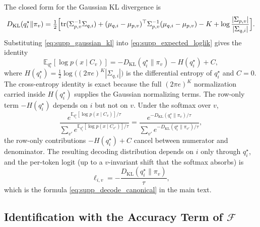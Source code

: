 \documentclass[twoside,11pt]{article}
\begin{document}
The closed form for the Gaussian KL divergence \cite[App.~B]{Bishop2006} is
\begin{equation}
D_{\mathrm{KL}}(q_i^{\star} \| \pi_v)
=
\tfrac{1}{2}\Bigl[
\mathrm{tr}(\Sigma_{p,v}^{-1}\Sigma_{q,i})
+ (\mu_{q,i} - \mu_{p,v})^{\top} \Sigma_{p,v}^{-1} (\mu_{q,i} - \mu_{p,v})
- K
+ \log\frac{|\Sigma_{p,v}|}{|\Sigma_{q,i}|}
\Bigr].
\label{eq:supp_gaussian_kl}
\end{equation}
Substituting \eqref{eq:supp_gaussian_kl} into \eqref{eq:supp_expected_loglik} gives the identity
\begin{equation}
\mathbb{E}_{q_i^{\star}}[\log p(x \mid C_v)]
=
-D_{\mathrm{KL}}(q_i^{\star} \| \pi_v)
- H(q_i^{\star})
+ C,
\label{eq:supp_kl_decomposition}
\end{equation}
where $H(q_i^{\star}) = \tfrac{1}{2}\log\bigl((2\pi e)^K |\Sigma_{q,i}|\bigr)$ is the differential entropy of $q_i^{\star}$ and $C=0$. The cross-entropy identity is exact because the full $(2\pi e)^K$ normalization carried inside $H(q_i^{\star})$ supplies the Gaussian normalizing terms. The row-only term $-H(q_i^{\star})$ depends on $i$ but not on $v$. Under the softmax over $v$,
\begin{equation}
\frac{e^{\mathbb{E}_{q_i^{\star}}[\log p(x \mid C_v)]/\tau}}
     {\sum_{v'} e^{\mathbb{E}_{q_i^{\star}}[\log p(x \mid C_{v'})]/\tau}}
=
\frac{e^{-D_{\mathrm{KL}}(q_i^{\star} \| \pi_v)/\tau}}
     {\sum_{v'} e^{-D_{\mathrm{KL}}(q_i^{\star} \| \pi_{v'})/\tau}},
\label{eq:supp_softmax_cancellation}
\end{equation}
the row-only contributions $-H(q_i^{\star}) + C$ cancel between numerator and denominator. The resulting decoding distribution depends on $i$ only through $q_i^{\star}$, and the per-token logit (up to a $v$-invariant shift that the softmax absorbs) is
\begin{equation}
\ell_{i,v} = -\frac{D_{\mathrm{KL}}(q_i^{\star} \| \pi_v)}{\tau},
\label{eq:supp_decode_recovered}
\end{equation}
which is the formula \eqref{eq:supp_decode_canonical} in the main text.

\subsection{Identification with the Accuracy Term of $\mathcal{F}$}
\end{document}
